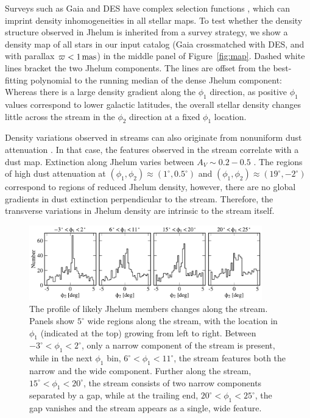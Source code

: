 \documentclass[twocolumn]{aastex62}
\begin{document}
Surveys such as Gaia and DES have complex selection functions \citep[e.g.,][]{bovy2017}, which can imprint density inhomogeneities in all stellar maps.
To test whether the density structure observed in Jhelum is inherited from a survey strategy, we show a density map of all stars in our input catalog (Gaia crossmatched with DES, and with parallax $\varpi<1\,\rm mas$) in the middle panel of Figure~\ref{fig:map}.
Dashed white lines bracket the two Jhelum components.
The lines are offset from the best-fitting polynomial to the running median of the dense Jhelum component:
\begin{equation}

\label{eq:track}
\end{equation}
Whereas there is a large density gradient along the $\phi_1$ direction, as positive $\phi_1$ values correspond to lower galactic latitudes, the overall stellar density changes little across the stream in the $\phi_2$ direction at a fixed $\phi_1$ location.

Density variations observed in streams can also originate from nonuniform dust attenuation \citep[e.g.,][]{ibata2016}.
In that case, the features observed in the stream correlate with a dust map.
Extinction along Jhelum varies between $A_V\sim0.2-0.5$ \citep[Figure~\ref{fig:map}, bottom;][]{sfd}.
The regions of high dust attenuation at $(\phi_1,\phi_2)\approx(1^\circ,0.5^\circ)$ and $(\phi_1,\phi_2)\approx(19^\circ,-2^\circ)$ correspond to regions of reduced Jhelum density, however, there are no global gradients in dust extinction perpendicular to the stream.
Therefore, the transverse variations in Jhelum density are intrinsic to the stream itself.

\begin{figure}
\begin{center}
\includegraphics[width=0.9\textwidth]{phi2_histograms.pdf}
\end{center}
\caption{
The profile of likely Jhelum members changes along the stream.
Panels show $5^\circ$ wide regions along the stream, with the location in $\phi_1$ (indicated at the top) growing from left to right.
Between $-3^\circ<\phi_1<2^\circ$, only a narrow component of the stream is present, while in the next $\phi_1$ bin, $6^\circ<\phi_1<11^\circ$, the stream features both the narrow and the wide component.
Further along the stream, $15^\circ<\phi_1<20^\circ$, the stream consists of two narrow components separated by a gap, while at the trailing end, $20^\circ<\phi_1<25^\circ$, the gap vanishes and the stream appears as a single, wide feature.
}
\label{fig:histo}
\end{figure}
\end{document}
